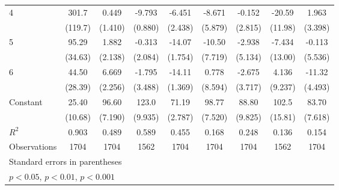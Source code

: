 \documentclass{article}
\begin{document}
{\begin{longtable}{l*{8}{c}}
4               &    301.7\sym{*}  &    0.449         &   -9.793\sym{***}&   -6.451\sym{*}  &   -8.671         &   -0.152         &   -20.59         &    1.963         \\
                &  (119.7)         &  (1.410)         &  (0.880)         &  (2.438)         &  (5.879)         &  (2.815)         &  (11.98)         &  (3.398)         \\
5               &    95.29\sym{*}  &    1.882         &   -0.313         &   -14.07\sym{***}&   -10.50         &   -2.938         &   -7.434         &   -0.113         \\
                &  (34.63)         &  (2.138)         &  (2.084)         &  (1.754)         &  (7.719)         &  (5.134)         &  (13.00)         &  (5.536)         \\
6               &    44.50         &    6.669\sym{*}  &   -1.795         &   -14.11\sym{***}&    0.778         &   -2.675         &    4.136         &   -11.32\sym{*}  \\
                &  (28.39)         &  (2.256)         &  (3.488)         &  (1.369)         &  (8.594)         &  (3.717)         &  (9.237)         &  (4.493)         \\
Constant        &    25.40\sym{*}  &    96.60\sym{***}&    123.0\sym{***}&    71.19\sym{***}&    98.77\sym{***}&    88.80\sym{***}&    102.5\sym{***}&    83.70\sym{***}\\
                &  (10.68)         &  (7.190)         &  (9.935)         &  (2.787)         &  (7.520)         &  (9.825)         &  (15.81)         &  (7.618)         \\
\hline
\(R^{2}\)       &    0.903         &    0.489         &    0.589         &    0.455         &    0.168         &    0.248         &    0.136         &    0.154         \\
Observations    &     1704         &     1704         &     1562         &     1704         &     1704         &     1704         &     1562         &     1704         \\
\hline\hline
\multicolumn{9}{l}{\footnotesize Standard errors in parentheses}\\
\multicolumn{9}{l}{\footnotesize \sym{*} \(p<0.05\), \sym{**} \(p<0.01\), \sym{***} \(p<0.001\)}\\
\end{longtable}
}
\end{document}
